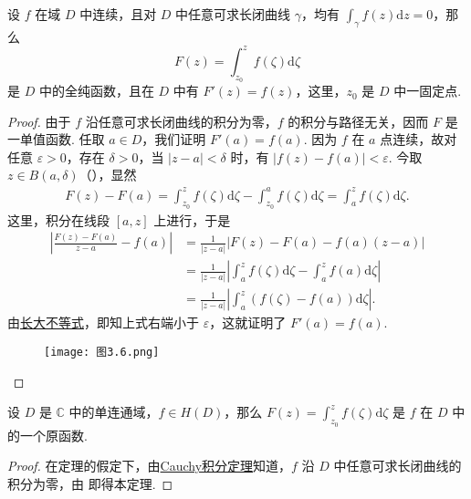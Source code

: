 \documentclass[../../main.tex]{subfiles}
\begin{document}
\begin{theorem}\label{theorem:定理3.3.2}
设 \( f \) 在域 \( D \) 中连续，且对 \( D \) 中任意可求长闭曲线 \( \gamma \)，均有 \( \int_{\gamma} f(z) \mathrm{d}z  = 0 \)，那么
\[
F(z) = \int_{z_0}^{z} f(\zeta) \mathrm{d}\zeta 
\]
是 \( D \) 中的全纯函数，且在 \( D \) 中有 \( F'(z) = f(z) \)，这里，\( z_0 \) 是 \( D \) 中一固定点.
\end{theorem}
\begin{proof}
由于 \( f \) 沿任意可求长闭曲线的积分为零，\( f \) 的积分与路径无关，因而 \( F \) 是一单值函数. 任取 \( a \in D \)，我们证明 \( F'(a) = f(a) \). 因为 \( f \) 在 \( a \) 点连续，故对任意 \( \varepsilon > 0 \)，存在 \( \delta > 0 \)，当 \( |z - a| < \delta \) 时，有 \( |f(z) - f(a)| < \varepsilon \). 今取 \( z \in B(a, \delta) \)（），显然
\begin{align*}
F(z) - F(a) = \int_{z_0}^{z} f(\zeta) \mathrm{d}\zeta  - \int_{z_0}^{a} f(\zeta) \mathrm{d}\zeta  = \int_{a}^{z} f(\zeta) \mathrm{d}\zeta .
\end{align*}
这里，积分在线段 \( [a, z] \) 上进行，于是
\begin{align*}
\left| \frac{F(z) - F(a)}{z - a} - f(a) \right| 
&= \frac{1}{|z - a|} \left| F(z) - F(a) - f(a)(z - a) \right| \\
&= \frac{1}{|z - a|} \left| \int_{a}^{z} f(\zeta) \mathrm{d}\zeta  - \int_{a}^{z} f(a) \mathrm{d}\zeta  \right| \\
&= \frac{1}{|z - a|} \left| \int_{a}^{z} (f(\zeta) - f(a)) \mathrm{d}\zeta  \right|.
\end{align*}
由\hyperref[proposition:长大不等式]{长大不等式}，即知上式右端小于 \( \varepsilon \)，这就证明了 \( F'(a) = f(a) \).
\begin{figure}[H]
\centering
\texttt{[image: 图3.6.png]}
\caption{}
\label{figure:图3.6}
\end{figure}
\end{proof}

\begin{theorem}\label{theorem:定理3.3.3}
设 \( D \) 是 \( \mathbb{C} \) 中的单连通域，\( f \in H(D) \)，那么 \( F(z) = \int_{z_0}^{z} f(\zeta) \mathrm{d}\zeta  \) 是 \( f \) 在 \( D \) 中的一个原函数.
\end{theorem}
\begin{proof}
在定理的假定下，由\hyperref[theorem:Cauchy-Goursat定理(Cauchy积分定理)]{Cauchy积分定理}知道，\( f \) 沿 \( D \) 中任意可求长闭曲线的积分为零，由 即得本定理.
\end{proof}
\end{document}

